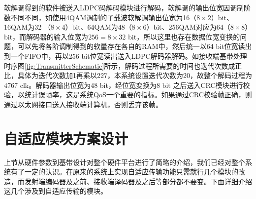 软解调得到的软件被送入LDPC码解码模块进行解码，软解调的输出位宽因调制阶数不同不同，如使用4QAM调制的子载波软解调输出位宽为16（$8\times 2$）bit、16QAM为32 （$8\times 4$）bit、64QAM为48（$8\times 6$）bit、256QAM对应为64（$8\times 8$）bit，而解码器的输入位宽为$256=8\times 32$ bit，所以这里也存在数据位宽变换的问题，可以先将各阶调制得到的软量存在各自的RAM中，然后统一以64 bit位宽读出到一个FIFO中，再以256 bit位宽读出送入LDPC解码器解码。如接收端基带处理时序图\ref{fig:TransmitterSchematic}所示，解码过程所需要的时间也迭代次数成正比，具体为迭代次数加1再乘以227，本系统设置迭代次数为20，故整个解码过程为4767 clk。解码器输出位宽为48 bit，经位宽变换为8 bit 之后送入CRC模块进行校验，以统计误帧率，这是系统QoS一个重要的指标。如果通过CRC校验帧正确，则通过以太网接口送入接收端计算机，否则丢弃该帧。


\section{自适应模块方案设计}
上节从硬件参数到基带设计对整个硬件平台进行了简略的介绍，我们已经对整个系统有了一定的认识。在原来的系统上实现自适应传输功能只需就行几个模块的改造，而发射端编码器及之前、接收端译码器及之后等部分都不要变。下面详细介绍这几个涉及到自适应传输的模块。
